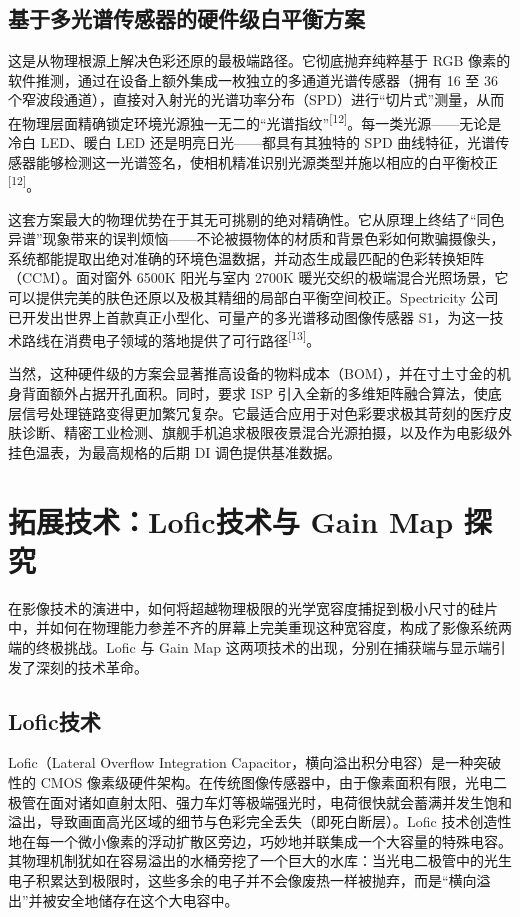 \documentclass[12pt, a4paper]{ctexart}
\newcommand{\scite}[1]{\textsuperscript{[#1]}}
\begin{document}
\subsection{基于多光谱传感器的硬件级白平衡方案}

这是从物理根源上解决色彩还原的最极端路径。它彻底抛弃纯粹基于 RGB 像素的软件推测，通过在设备上额外集成一枚独立的多通道光谱传感器（拥有 16 至 36 个窄波段通道），直接对入射光的光谱功率分布（SPD）进行“切片式”测量，从而在物理层面精确锁定环境光源独一无二的“光谱指纹”\scite{12}。每一类光源——无论是冷白 LED、暖白 LED 还是明亮日光——都具有其独特的 SPD 曲线特征，光谱传感器能够检测这一光谱签名，使相机精准识别光源类型并施以相应的白平衡校正\scite{12}。

这套方案最大的物理优势在于其无可挑剔的绝对精确性。它从原理上终结了“同色异谱”现象带来的误判烦恼——不论被摄物体的材质和背景色彩如何欺骗摄像头，系统都能提取出绝对准确的环境色温数据，并动态生成最匹配的色彩转换矩阵（CCM）。面对窗外 6500K 阳光与室内 2700K 暖光交织的极端混合光照场景，它可以提供完美的肤色还原以及极其精细的局部白平衡空间校正。Spectricity 公司已开发出世界上首款真正小型化、可量产的多光谱移动图像传感器 S1，为这一技术路线在消费电子领域的落地提供了可行路径\scite{13}。

当然，这种硬件级的方案会显著推高设备的物料成本（BOM），并在寸土寸金的机身背面额外占据开孔面积。同时，要求 ISP 引入全新的多维矩阵融合算法，使底层信号处理链路变得更加繁冗复杂。它最适合应用于对色彩要求极其苛刻的医疗皮肤诊断、精密工业检测、旗舰手机追求极限夜景混合光源拍摄，以及作为电影级外挂色温表，为最高规格的后期 DI 调色提供基准数据。

\section{拓展技术：Lofic技术与 Gain Map 探究}

在影像技术的演进中，如何将超越物理极限的光学宽容度捕捉到极小尺寸的硅片中，并如何在物理能力参差不齐的屏幕上完美重现这种宽容度，构成了影像系统两端的终极挑战。Lofic 与 Gain Map 这两项技术的出现，分别在捕获端与显示端引发了深刻的技术革命。

\subsection{Lofic技术}

Lofic（Lateral Overflow Integration Capacitor，横向溢出积分电容）是一种突破性的 CMOS 像素级硬件架构。在传统图像传感器中，由于像素面积有限，光电二极管在面对诸如直射太阳、强力车灯等极端强光时，电荷很快就会蓄满并发生饱和溢出，导致画面高光区域的细节与色彩完全丢失（即死白断层）。Lofic 技术创造性地在每一个微小像素的浮动扩散区旁边，巧妙地并联集成一个大容量的特殊电容。其物理机制犹如在容易溢出的水桶旁挖了一个巨大的水库：当光电二极管中的光生电子积累达到极限时，这些多余的电子并不会像废热一样被抛弃，而是“横向溢出”并被安全地储存在这个大电容中。
\end{document}

